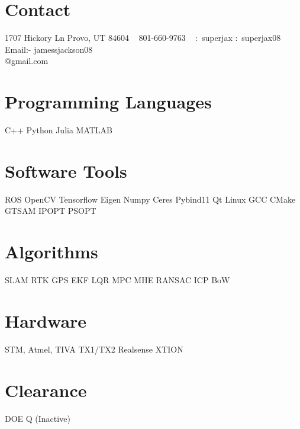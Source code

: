 
\begin{aside}
\section{Contact}
1707 Hickory Ln
Provo, UT 84604
~
801-660-9763
~
\github:~superjax
\linkedin:~superjax08
~
Email:-
jamessjackson08\\@gmail.com
%
\section{Programming Languages}
\hspace{3em}\cpp\hfill C++
\hspace{3em}\python\hfill Python
\hspace{3em}\julia\hfill Julia
\hspace{3em}\matlab\hfill MATLAB
%
\section{Software Tools}
\hspace{3em} \ros\hfill ROS
\hspace{3em} \opencv\hfill OpenCV
\hspace{3em} \tensorflow\hfill Tensorflow
\hspace{3em} \eigen\hfill Eigen
\hspace{3em} \numpy\hfill Numpy
Ceres
Pybind11
\hspace{3em} \qt\hfill Qt
Linux
GCC
\hspace{3em} \cmake\hfill CMake
GTSAM
IPOPT
PSOPT
%
\section{Algorithms}
SLAM
RTK GPS
EKF
LQR
MPC
MHE
RANSAC
ICP
BoW
%
\section{Hardware}
STM, Atmel, TIVA
TX1/TX2
Realsense
XTION
%
\section{Clearance}
DOE Q (Inactive)
\end{aside}